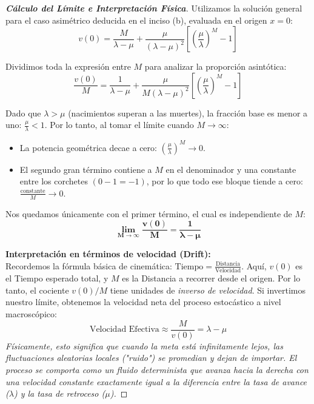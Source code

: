 \documentclass[10pt,a4paper]{article}
\begin{document}
\begin{proof}[\textbf{Cálculo del Límite e Interpretación Física}]
    Utilizamos la solución general para el caso asimétrico deducida en el inciso (b), evaluada en el origen $x=0$:
    \[ v(0) = \frac{M}{\lambda-\mu} + \frac{\mu}{(\lambda-\mu)^2} \left[ \left(\frac{\mu}{\lambda}\right)^M - 1 \right] \]
    
    Dividimos toda la expresión entre $M$ para analizar la proporción asintótica:
    \[ \frac{v(0)}{M} = \frac{1}{\lambda-\mu} + \frac{\mu}{M(\lambda-\mu)^2} \left[ \left(\frac{\mu}{\lambda}\right)^M - 1 \right] \]
    
    Dado que $\lambda > \mu$ (nacimientos superan a las muertes), la fracción base es menor a uno: $\frac{\mu}{\lambda} < 1$.
    Por lo tanto, al tomar el límite cuando $M \to \infty$:
    \begin{itemize}
        \item La potencia geométrica decae a cero: $\left(\frac{\mu}{\lambda}\right)^M \to 0$.
        \item El segundo gran término contiene a $M$ en el denominador y una constante entre los corchetes $(0 - 1 = -1)$, por lo que todo ese bloque tiende a cero: $\frac{\text{constante}}{M} \to 0$.
    \end{itemize}
    
    Nos quedamos únicamente con el primer término, el cual es independiente de $M$:
    \[ \mathbf{\lim_{M \to \infty} \frac{v(0)}{M} = \frac{1}{\lambda-\mu}} \]
    
    \textbf{Interpretación en términos de velocidad (Drift):} \\
    Recordemos la fórmula básica de cinemática: $\text{Tiempo} = \frac{\text{Distancia}}{\text{Velocidad}}$.
    Aquí, $v(0)$ es el Tiempo esperado total, y $M$ es la Distancia a recorrer desde el origen. Por lo tanto, el cociente $v(0)/M$ tiene unidades de \textit{inverso de velocidad}.
    Si invertimos nuestro límite, obtenemos la velocidad neta del proceso estocástico a nivel macroscópico:
    \[ \text{Velocidad Efectiva} \approx \frac{M}{v(0)} = \lambda - \mu \]
    \textit{Físicamente, esto significa que cuando la meta está infinitamente lejos, las fluctuaciones aleatorias locales ("ruido") se promedian y dejan de importar. El proceso se comporta como un fluido determinista que avanza hacia la derecha con una velocidad constante exactamente igual a la diferencia entre la tasa de avance ($\lambda$) y la tasa de retroceso ($\mu$).}
\end{proof}
\end{document}
